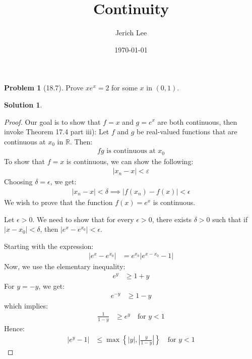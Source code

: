 \documentclass[12pt]{article}
\title{Continuity}
\author{Jerich Lee}
\date{\today}
\theoremstyle{definition} %
\newtheorem{solution}{Solution}
\newtheorem{problem}{Problem}
\theoremstyle{plain} %
\begin{document}
\maketitle
\begin{problem}[18.7]
  Prove $xe^{x} =2$ for some $x$ in $(0,1)$.  
\end{problem}
\begin{solution}
  \begin{proof}
    Our goal is to show that $f=x$ and $g=e^{x}$ are both continuous, then invoke Theorem 17.4 part iii): Let $f$ and $g$ be real-valued functions that are continuous at $x_0$ in $\mathbb{R} $. Then: 
    \begin{align}
     fg \text{ is continuous at } x_0 
    \end{align}
    To show that $f=x$ is continuous, we can show the following:
    \begin{align}
     \left\vert x_n -x\right\vert <\varepsilon
    \end{align}
    Choosing $\delta =\epsilon $, we get:
    \begin{align}
     \left\vert x_{n} -x \right\vert <\delta \implies \left\vert f(x_n)-f(x) \right\vert <\epsilon
    \end{align} 
    We wish to prove that the function $ f(x) = e^x $ is continuous.
  
    Let $ \epsilon > 0 $. We need to show that for every $ \epsilon > 0 $, there exists $ \delta > 0 $ such that if $ |x - x_0| < \delta $, then $ |e^x - e^{x_0}| < \epsilon $.
    
    Starting with the expression:
    \begin{align}
    |e^x - e^{x_0}| &= e^{x_0} |e^{x - x_0} - 1|
    \end{align}
    Now, we use the elementary inequality:
    \begin{align}
    e^y &\geq 1 + y
    \end{align}
    For $ y = -y $, we get:
    \begin{align}
    e^{-y} &\geq 1 - y
    \end{align}
    which implies:
    \begin{align}
    \frac{1}{1 - y} &\geq e^y \quad \text{for } y < 1
    \end{align}
    Hence:
    \begin{align}
    |e^y - 1| &\leq \max \left\{ |y|, \left| \frac{y}{1 - y} \right| \right\} \quad \text{for } y < 1
    \end{align}
    

\end{proof}
\end{solution}
\end{document}
